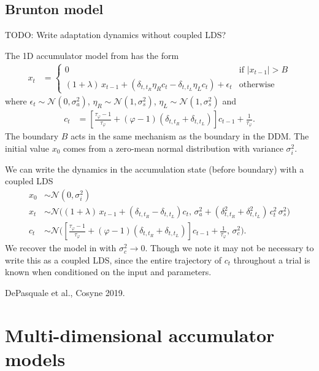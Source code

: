 \documentclass{article}
\begin{document}
\subsection{Brunton model}

TODO: Write adaptation dynamics without coupled LDS?

The 1D accumulator model from \cite{brunton2013rats} has the form
\begin{align*}
x_t &= 
\begin{cases}
0 & \text{if } |x_{t-1}|>B \\
(1 + \lambda) \, x_{t-1} + \left( \delta_{t,t_R} \eta_R c_t - \delta_{t,t_L} \eta_L c_t \right) + \epsilon_t & \text{otherwise}
\end{cases}
\end{align*}
where $\epsilon_t \sim \mathcal{N}(0,\sigma_a^2)$, $\eta_R \sim \mathcal{N}(1, \sigma_s^2)$, $\eta_L \sim \mathcal{N}(1, \sigma_s^2)$ and 
\begin{align*}
c_t &= \left[ \frac{\tau_\varphi - 1}{\tau_\varphi} + (\varphi - 1) (\delta_{t,t_R} + \delta_{t,t_L}) \right] c_{t-1} + \frac{1}{\tau_\varphi}.
\end{align*}
The boundary $B$ acts in the same mechanism as the boundary in the DDM. The initial value $x_0$ comes from a zero-mean normal distribution with variance $\sigma_i^2$.

We can write the dynamics in the accumulation state (before boundary) with a coupled LDS
\begin{align*}
x_0 & \sim \mathcal{N}(0, \sigma_i^2) \\
x_t & \sim \mathcal{N} \bigg((1 + \lambda) \, x_{t-1} + ( \delta_{t,t_R} -  \delta_{t,t_L} ) c_t , \, \sigma_a^2 + (\delta_{t,t_R}^2 + \delta_{t,t_L}^2)\,  c_t^2 \, \sigma_s^2 \bigg)\\
c_t & \sim \mathcal{N} \bigg(\left[ \frac{\tau_\varphi - 1}{\tau_\varphi} + (\varphi - 1) (\delta_{t,t_R} + \delta_{t,t_L}) \right] c_{t-1} + \frac{1}{\tau_\varphi}, \, \sigma_c^2 \bigg).
\end{align*}
We recover the model in \cite{brunton2013rats} with $\sigma_c^2 \rightarrow 0$. Though we note it may not be necessary to write this as a coupled LDS, since the entire trajectory of $c_t$ throughout a trial is known when conditioned on the input and parameters. 

DePasquale et al., Cosyne 2019.

\section{Multi-dimensional accumulator models}
\end{document}
